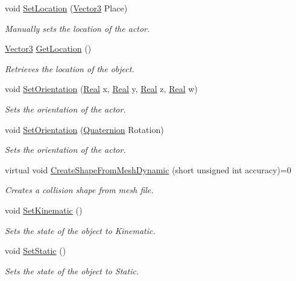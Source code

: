 \begin{DoxyCompactItemize}
void \hyperlink{classphys_1_1ActorBase_a3212be459859a67bf7ae64919d58d5a5}{SetLocation} (\hyperlink{classphys_1_1Vector3}{Vector3} Place)
\begin{DoxyCompactList}\small\item\em Manually sets the location of the actor. \item\end{DoxyCompactList}\item 
\hyperlink{classphys_1_1Vector3}{Vector3} \hyperlink{classphys_1_1ActorBase_af554468ebd26c0e06301e52cb6fcfda8}{GetLocation} ()
\begin{DoxyCompactList}\small\item\em Retrieves the location of the object. \item\end{DoxyCompactList}\item 
void \hyperlink{classphys_1_1ActorBase_adbf0cc77031f22597a799fd0f7f8216d}{SetOrientation} (\hyperlink{namespacephys_af7eb897198d265b8e868f45240230d5f}{Real} x, \hyperlink{namespacephys_af7eb897198d265b8e868f45240230d5f}{Real} y, \hyperlink{namespacephys_af7eb897198d265b8e868f45240230d5f}{Real} z, \hyperlink{namespacephys_af7eb897198d265b8e868f45240230d5f}{Real} w)
\begin{DoxyCompactList}\small\item\em Sets the orientation of the actor. \item\end{DoxyCompactList}\item 
void \hyperlink{classphys_1_1ActorBase_ac4b0bf1eff730d94f72d04957efea69d}{SetOrientation} (\hyperlink{classphys_1_1Quaternion}{Quaternion} Rotation)
\begin{DoxyCompactList}\small\item\em Sets the orientation of the actor. \item\end{DoxyCompactList}\item 
virtual void \hyperlink{classphys_1_1ActorBase_aa41370f6d2031a9dad8df45bd7f3bcc6}{CreateShapeFromMeshDynamic} (short unsigned int accuracy)=0
\begin{DoxyCompactList}\small\item\em Creates a collision shape from mesh file. \item\end{DoxyCompactList}\item 
void \hyperlink{classphys_1_1ActorBase_acd5613286ec14fb2a8e5ed5f5003dc5f}{SetKinematic} ()
\begin{DoxyCompactList}\small\item\em Sets the state of the object to Kinematic. \item\end{DoxyCompactList}\item 
void \hyperlink{classphys_1_1ActorBase_af0219532fe71d1d84042a20a88fe5037}{SetStatic} ()
\begin{DoxyCompactList}\small\item\em Sets the state of the object to Static. \item\end{DoxyCompactList}\end{DoxyCompactItemize}
